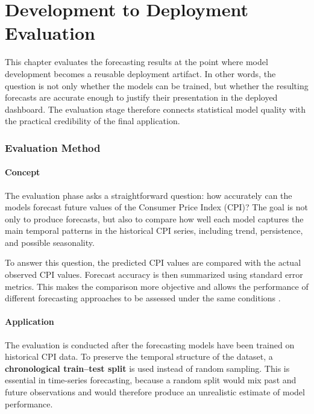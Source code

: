 %
%
%

\chapter{Development to Deployment Evaluation}

This chapter evaluates the forecasting results at the point where model development becomes a reusable deployment artifact. In other words, the question is not only whether the models can be trained, but whether the resulting forecasts are accurate enough to justify their presentation in the deployed dashboard. The evaluation stage therefore connects statistical model quality with the practical credibility of the final application.

\subsection{Evaluation Method}

\subsubsection{Concept}

The evaluation phase asks a straightforward question: how accurately can the models forecast future values of the Consumer Price Index (CPI)? The goal is not only to produce forecasts, but also to compare how well each model captures the main temporal patterns in the historical CPI series, including trend, persistence, and possible seasonality.

To answer this question, the predicted CPI values are compared with the actual observed CPI values. Forecast accuracy is then summarized using standard error metrics. This makes the comparison more objective and allows the performance of different forecasting approaches to be assessed under the same conditions \cite{Hyndman2021,Box2015}.

\subsubsection{Application}

The evaluation is conducted after the forecasting models have been trained on historical CPI data. To preserve the temporal structure of the dataset, a \textbf{chronological train--test split} is used instead of random sampling. This is essential in time-series forecasting, because a random split would mix past and future observations and would therefore produce an unrealistic estimate of model performance.

